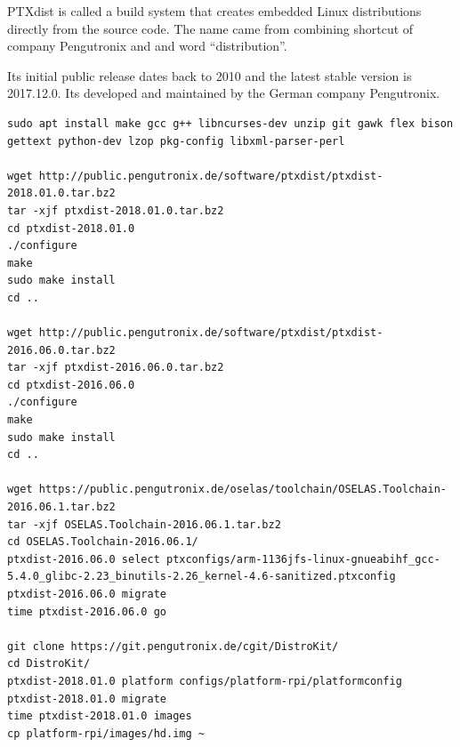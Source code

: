 \documentclass[printmode]{mgr}
\begin{document}
PTXdist is called a build system that creates embedded Linux distributions directly from the source code. The name came from combining shortcut of company Pengutronix and and word ``distribution''.

Its initial public release dates back to 2010 and the latest stable version is 2017.12.0. Its developed and maintained by the German company Pengutronix.













\begin{lstlisting}
sudo apt install make gcc g++ libncurses-dev unzip git gawk flex bison gettext python-dev lzop pkg-config libxml-parser-perl

wget http://public.pengutronix.de/software/ptxdist/ptxdist-2018.01.0.tar.bz2
tar -xjf ptxdist-2018.01.0.tar.bz2
cd ptxdist-2018.01.0
./configure
make
sudo make install
cd ..

wget http://public.pengutronix.de/software/ptxdist/ptxdist-2016.06.0.tar.bz2
tar -xjf ptxdist-2016.06.0.tar.bz2
cd ptxdist-2016.06.0
./configure
make
sudo make install
cd ..

wget https://public.pengutronix.de/oselas/toolchain/OSELAS.Toolchain-2016.06.1.tar.bz2
tar -xjf OSELAS.Toolchain-2016.06.1.tar.bz2
cd OSELAS.Toolchain-2016.06.1/
ptxdist-2016.06.0 select ptxconfigs/arm-1136jfs-linux-gnueabihf_gcc-5.4.0_glibc-2.23_binutils-2.26_kernel-4.6-sanitized.ptxconfig
ptxdist-2016.06.0 migrate
time ptxdist-2016.06.0 go

git clone https://git.pengutronix.de/cgit/DistroKit/
cd DistroKit/
ptxdist-2018.01.0 platform configs/platform-rpi/platformconfig
ptxdist-2018.01.0 migrate
time ptxdist-2018.01.0 images
cp platform-rpi/images/hd.img ~
\end{lstlisting}
\end{document}
